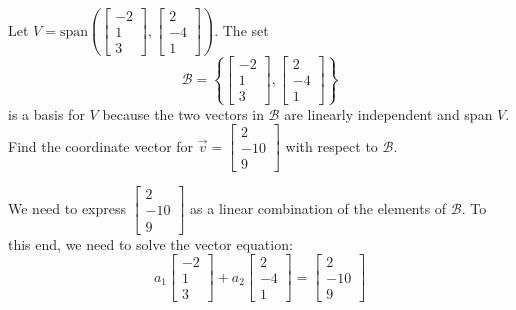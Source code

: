 \documentclass{ximera}
\begin{document}

\begin{example}
Let $V=\mbox{span}\left(\begin{bmatrix}-2\\1\\3\end{bmatrix},\begin{bmatrix}2\\-4\\1\end{bmatrix}\right)$.  The set $$\mathcal{B}=\left\{\begin{bmatrix}-2\\1\\3\end{bmatrix},\begin{bmatrix}2\\-4\\1\end{bmatrix}\right\}$$ is a basis for $V$ because the two vectors in $\mathcal{B}$ are linearly independent and span $V$.  Find the coordinate vector for $\vec{v}=\begin{bmatrix}2\\-10\\9\end{bmatrix}$ with respect to $\mathcal{B}$.
\begin{explanation}
We need to express $\begin{bmatrix}2\\-10\\9\end{bmatrix}$ as a linear combination of the elements of $\mathcal{B}$.  To this end, we need to solve the vector equation:
 $$a_1\begin{bmatrix}-2\\1\\3\end{bmatrix}+a_2\begin{bmatrix}2\\-4\\1\end{bmatrix}=\begin{bmatrix}2\\-10\\9\end{bmatrix}$$

\end{explanation}
\end{example}
\end{document}

